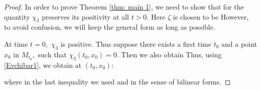 \documentclass{amsart}
\begin{document}
\begin{proof}
In order to prove Theorem \ref{thm: main 1}, we need to show that for
the quantity $\chi_3$ preserves its positivity at all $t>0.$ Here $\zeta$ is chosen to be
However, to avoid confusion, we will keep the general form as long as possible.

At time $t=0,$ $\chi_3$ is positive.
Thus suppose there exists a first time $t_0$ and a point $x_0$ in $M_{t_0},$ such that $\chi_3(t_0,x_0)=0.$
Then we also obtain
Thus, using \eqref{Evchibar1}, we obtain at $(t_0,x_0):$

where in the last inequality we used
and
in the sense of bilinear forms.


\end{proof}
\end{document}

